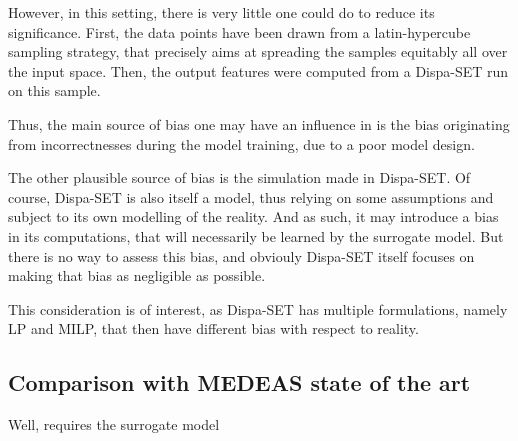 However, in this setting, there is very little one could do to reduce its significance. First, the data points have been drawn from a latin-hypercube sampling strategy, that precisely aims at spreading the samples equitably all over the input space. Then, the output features were computed from a Dispa-SET run on this sample.

Thus, the main source of bias one may have an influence in is the bias originating from incorrectnesses during the model training, due to a poor model design.

The other plausible source of bias is the simulation made in Dispa-SET. Of course, Dispa-SET is also itself a model, thus relying on some assumptions and subject to its own modelling of the reality. And as such, it may introduce a bias in its computations, that will necessarily be learned by the surrogate model. But there is no way to assess this bias, and obviouly Dispa-SET itself focuses on making that bias as negligible as possible.

This consideration is of interest, as Dispa-SET has multiple formulations, namely LP and MILP, that then have different bias with respect to reality.

\subsection{Comparison with MEDEAS state of the art}

Well, requires the surrogate model

